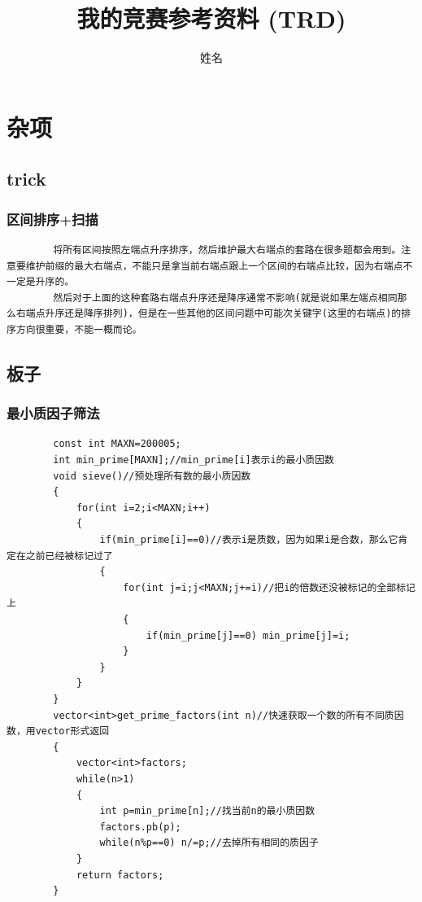 \documentclass[10pt, a4paper, twocolumn]{article} %
\begin{document}
\title{我的竞赛参考资料 (TRD)}
\author{姓名}
\maketitle
\tableofcontents %
\newpage


\section{杂项}
    \subsection{trick}
    \subsubsection{区间排序+扫描}
    \begin{lstlisting}
        将所有区间按照左端点升序排序，然后维护最大右端点的套路在很多题都会用到。注意要维护前缀的最大右端点，不能只是拿当前右端点跟上一个区间的右端点比较，因为右端点不一定是升序的。
        然后对于上面的这种套路右端点升序还是降序通常不影响(就是说如果左端点相同那么右端点升序还是降序排列)，但是在一些其他的区间问题中可能次关键字(这里的右端点)的排序方向很重要，不能一概而论。
    \end{lstlisting}
    \subsection{板子}
    \subsubsection{最小质因子筛法}    
    \begin{lstlisting}
        const int MAXN=200005;
		int min_prime[MAXN];//min_prime[i]表示i的最小质因数
		void sieve()//预处理所有数的最小质因数
		{
			for(int i=2;i<MAXN;i++)
			{
				if(min_prime[i]==0)//表示i是质数，因为如果i是合数，那么它肯定在之前已经被标记过了   
				{
					for(int j=i;j<MAXN;j+=i)//把i的倍数还没被标记的全部标记上
					{
						if(min_prime[j]==0) min_prime[j]=i;
					}
				}
			}
		}
		vector<int>get_prime_factors(int n)//快速获取一个数的所有不同质因数，用vector形式返回
		{
			vector<int>factors;
			while(n>1)
			{
				int p=min_prime[n];//找当前n的最小质因数
				factors.pb(p);
				while(n%p==0) n/=p;//去掉所有相同的质因子
			}
			return factors;
		}
    \end{lstlisting}
\end{document}
